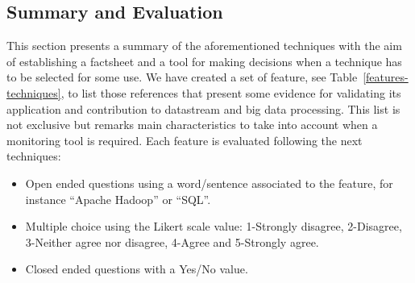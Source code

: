 \subsection{Summary and Evaluation}
This section presents a summary of the aforementioned techniques with the aim
of establishing a factsheet and a tool for making decisions when a technique 
has to be selected for some use. We have created a set of feature, see Table~\ref{features-techniques}, 
to list those references that present some evidence for validating its application 
and contribution to datastream and big data processing. This list is not exclusive 
but remarks main characteristics to take into account when a monitoring tool 
is required. Each feature is evaluated following the next techniques:
\begin{itemize}
 \item Open ended questions using a word/sentence associated to the feature, for instance ``Apache Hadoop'' or ``SQL''.
 \item Multiple choice using the Likert scale value: 1-Strongly disagree, 2-Disagree, 3-Neither agree nor disagree, 4-Agree and 5-Strongly agree.
 \item Closed ended questions with a Yes/No value. 
\end{itemize}


